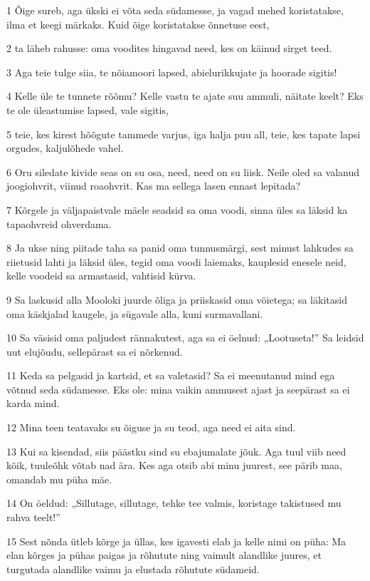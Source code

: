 \par 1 Õige sureb, aga ükski ei võta seda südamesse, ja vagad mehed koristatakse, ilma et keegi märkaks. Kuid õige koristatakse õnnetuse eest,
\par 2 ta läheb rahusse: oma voodites hingavad need, kes on käinud sirget teed.
\par 3 Aga teie tulge siia, te nõiamoori lapsed, abielurikkujate ja hoorade sigitis!
\par 4 Kelle üle te tunnete rõõmu? Kelle vastu te ajate suu ammuli, näitate keelt? Eks te ole üleastumise lapsed, vale sigitis,
\par 5 teie, kes kirest hõõgute tammede varjus, iga halja puu all, teie, kes tapate lapsi orgudes, kaljulõhede vahel.
\par 6 Oru siledate kivide seas on su osa, need, need on su liisk. Neile oled sa valanud joogiohvrit, viinud roaohvrit. Kas ma sellega lasen ennast lepitada?
\par 7 Kõrgele ja väljapaistvale mäele seadsid sa oma voodi, sinna üles sa läksid ka tapaohvreid ohverdama.
\par 8 Ja ukse ning piitade taha sa panid oma tunnusmärgi, sest minust lahkudes sa riietusid lahti ja läksid üles, tegid oma voodi laiemaks, kauplesid enesele neid, kelle voodeid sa armastasid, vahtisid kürva.
\par 9 Sa laskusid alla Mooloki juurde õliga ja priiskasid oma võietega; sa läkitasid oma käskjalad kaugele, ja sügavale alla, kuni surmavallani.
\par 10 Sa väsisid oma paljudest rännakutest, aga sa ei öelnud: „Lootuseta!” Sa leidsid uut elujõudu, sellepärast sa ei nõrkenud.
\par 11 Keda sa pelgasid ja kartsid, et sa valetasid? Sa ei meenutanud mind ega võtnud seda südamesse. Eks ole: mina vaikin ammusest ajast ja seepärast sa ei karda mind.
\par 12 Mina teen teatavaks su õiguse ja su teod, aga need ei aita sind.
\par 13 Kui sa kisendad, siis päästku sind su ebajumalate jõuk. Aga tuul viib need kõik, tuuleõhk võtab nad ära. Kes aga otsib abi minu juurest, see pärib maa, omandab mu püha mäe.
\par 14 On öeldud: „Sillutage, sillutage, tehke tee valmis, koristage takistused mu rahva teelt!”
\par 15 Sest nõnda ütleb kõrge ja üllas, kes igavesti elab ja kelle nimi on püha: Ma elan kõrges ja pühas paigas ja rõhutute ning vaimult alandlike juures, et turgutada alandlike vaimu ja elustada rõhutute südameid.
